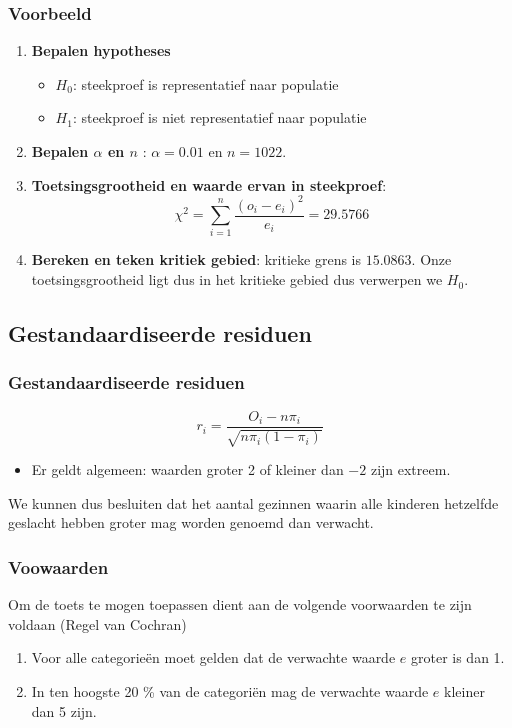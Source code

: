 \documentclass{beamer}
\begin{document}
\begin{frame}
  \frametitle{Voorbeeld}
  \begin{enumerate}
  \item \textbf{Bepalen hypotheses}
    \begin{itemize}
      \item $H_{0}$: steekproef is representatief naar populatie
      \item $H_{1}$: steekproef is niet representatief naar populatie
    \end{itemize}
  \item \textbf{Bepalen $\alpha$ en $n$} : $\alpha = 0.01$ en $n = 1022$.
  \item \textbf{Toetsingsgrootheid en waarde ervan in steekproef}:
  \[ \chi^{2} = \sum_{i=1}^{n} \frac{(o_{i} - e_{i})^{2}}{e_{i}} = 29.5766 \]
  \item \textbf{Bereken en teken kritiek gebied}:  kritieke grens is $15.0863$. Onze toetsingsgrootheid ligt dus in het kritieke gebied dus verwerpen we $H_{0}$.
\end{enumerate}
\end{frame}

\subsection{Gestandaardiseerde residuen}
\begin{frame}
  \frametitle{Gestandaardiseerde residuen}
  \[ r_{i} = \frac{O_{i} - n \pi_{i}}{\sqrt{n \pi_{i}(1-\pi_{i})}} \]

  \begin{itemize}
    \item Er geldt algemeen: waarden groter 2 of kleiner dan $-2$ zijn extreem.
  \end{itemize}
  We kunnen dus besluiten dat het aantal gezinnen waarin alle kinderen hetzelfde geslacht hebben groter mag worden genoemd dan verwacht.

\end{frame}

\begin{frame}
  \frametitle{Voowaarden}
   Om de toets te mogen toepassen dient aan de volgende voorwaarden te zijn voldaan (Regel van Cochran)
\begin{enumerate}
  \item Voor alle categorie\"en moet gelden dat de verwachte waarde $e$ groter is dan 1.
  \item In ten hoogste 20 \% van de categori\"en mag de verwachte waarde $e$ kleiner dan 5 zijn.
\end{enumerate}
\end{frame}
\end{document}
